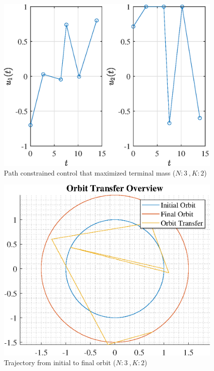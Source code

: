 \documentclass[]{article}
\begin{document}
\begin{figure}
	\centering
	\includegraphics[scale=0.75]{path_N3_K2_C3_mf.eps}
	\caption{Path constrained control that maximized terminal mass (\(N:3\ , K:2\))}
	\label{fig:path_N3_K2_C3_mf}
\end{figure}
\begin{figure}
	\centering
	\includegraphics[scale=0.75]{orbit_N3_K2_C3_mf.eps}
	\caption{Trajectory from initial to final orbit (\(N:3\ , K:2\))}
	\label{fig:orbit_N3_K2_C3_mf}
\end{figure}
\end{document}
